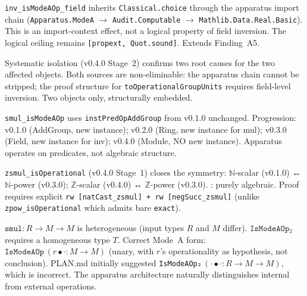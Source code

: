 \begin{finding}
\label{finding:A15}
\leanok
{}
\texttt{inv\_isModeAOp\_field} inherits \texttt{Classical.choice} through
the apparatus import chain (\texttt{Apparatus.ModeA} $\to$ \texttt{Audit.Computable}
$\to$ \texttt{Mathlib.Data.Real.Basic}).  This is an import-context
effect, not a logical property of field inversion.  The logical ceiling
remains \texttt{[propext, Quot.sound]}.  Extends Finding~A5.
\end{finding}

\begin{finding}
\label{finding:A16}
\leanok
{}
Systematic isolation (v0.4.0 Stage~2) confirms two root causes for the
two affected objects.  Both sources are non-eliminable: the apparatus
chain cannot be stripped; the proof structure for \texttt{toOperationalGroupUnits}
requires field-level inversion.  Two objects only, structurally embedded.
\end{finding}

\begin{finding}
\label{finding:A17}
\leanok
{}
\texttt{smul\_isModeAOp} uses \texttt{instPredOpAddGroup} from v0.1.0
unchanged.  Progression: v0.1.0 (AddGroup, new instance); v0.2.0 (Ring,
new instance for mul); v0.3.0 (Field, new instance for inv); v0.4.0
(Module, NO new instance).  Apparatus operates on predicates, not algebraic
structure.
\end{finding}

\begin{finding}
\label{finding:A18}
\leanok
{}
\texttt{zsmul\_isOperational} (v0.4.0 Stage~1) closes the symmetry:
$\mathbb{N}$-scalar (v0.1.0) ↔ $\mathbb{N}$-power (v0.3.0);
$\mathbb{Z}$-scalar (v0.4.0) ↔ $\mathbb{Z}$-power (v0.3.0).
\axiomprofile{[]}: purely algebraic.
Proof requires explicit \texttt{rw [natCast\_zsmul] + rw [negSucc\_zsmul]}
(unlike \texttt{zpow\_isOperational} which admits bare \texttt{exact}).
\end{finding}

\begin{finding}
\label{finding:A19}
\leanok
{}
$\texttt{smul} : R \to M \to M$ is heterogeneous (input types $R$ and $M$
differ).  $\texttt{IsModeAOp₂}$ requires a homogeneous type $T$.  Correct
Mode~A form: $\texttt{IsModeAOp}\,(r \bullet \cdot : M \to M)$ (unary,
with $r$'s operationality as hypothesis, not conclusion).
PLAN.md initially suggested \texttt{IsModeAOp₂}\,$({\cdot}\bullet{\cdot}
: R \to M \to M)$, which is incorrect.  The apparatus architecture
naturally distinguishes internal from external operations.
\end{finding}


